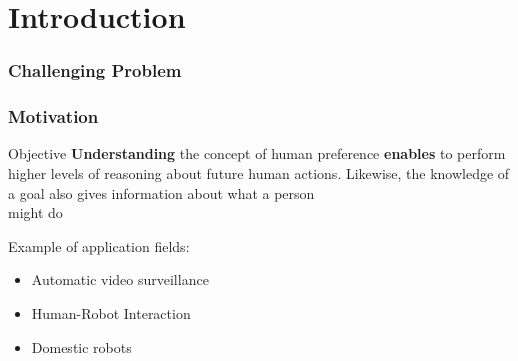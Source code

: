 \section{Introduction}

\begin{frame}
	\frametitle{Challenging Problem}
	
	\begin{center}
	\end{center}
\end{frame}

\begin{frame}
	\frametitle{Motivation}
	
	\vspace{0.4cm}
	
	\large
	
	\begin{block}{Objective}
		\textbf{Understanding} the concept of human preference \textbf{enables} to perform
		higher levels of reasoning about future human actions. Likewise, the knowledge of a
		goal also gives information about what a person\\ might do
	\end{block}
	
	\vspace{0.3cm}
	
	Example of application fields:
	
	\begin{itemize}
		\item Automatic video surveillance
		\item Human-Robot Interaction
		\item Domestic robots
	\end{itemize}
\end{frame}
